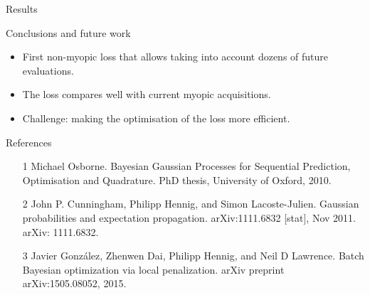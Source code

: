 \documentclass[15pt,serif,mathserif,final]{beamer}
\begin{document}
\begin{frame}{}
\begin{columns}[t]
\begin{column}{0.32\linewidth}
\begin{block}{Results}
      \end{block}



      \begin{block}{Conclusions and future work}
\begin{itemize}
\item First non-myopic loss that allows taking into account dozens of future evaluations.
\item The loss compares well with current myopic acquisitions.
\item Challenge: making the optimisation of the loss more efficient.
\end{itemize}

      \end{block}

\begin{block}{References}
\begin{itemize}
\item[1] Michael Osborne. Bayesian Gaussian Processes for Sequential Prediction, Optimisation and Quadrature. PhD thesis, University of Oxford, 2010.
\item[2] John P. Cunningham, Philipp Hennig, and Simon Lacoste-Julien. Gaussian probabilities and expectation propagation. arXiv:1111.6832 [stat], Nov 2011. arXiv: 1111.6832.
\item[3] Javier Gonz\'alez, Zhenwen Dai, Philipp Hennig, and Neil D Lawrence. Batch Bayesian optimization via local penalization. arXiv preprint arXiv:1505.08052, 2015.
\end{itemize}

\end{block}

    \end{column}%

  \end{columns}
\end{frame}
\end{document}
